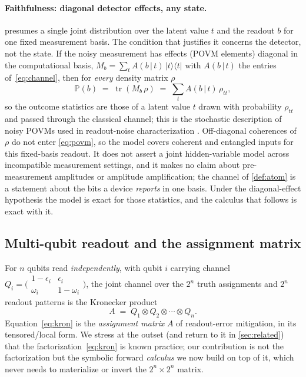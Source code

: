 \documentclass[11pt]{article}
\numberwithin{equation}{section}
\theoremstyle{plain}
\theoremstyle{definition}
\theoremstyle{remark}
\newcommand{\eps}{\epsilon}
\newcommand{\Prob}{\mathbb{P}}
\newcommand{\given}{\,\vert\,}
\newcommand{\ket}[1]{\lvert #1 \rangle}
\newcommand{\bra}[1]{\langle #1 \rvert}
\DeclareMathOperator{\tr}{tr}
\newcommand{\tensor}{\otimes}
\begin{document}
\paragraph{Faithfulness: diagonal detector effects, any state.}
 presumes a single joint distribution over the latent value $t$
and the readout $b$ for one fixed measurement basis. The condition that
justifies it concerns the detector, not the state. If the noisy measurement
has effects (POVM elements) diagonal in the computational basis,
$M_b=\sum_{t}A(b\given t)\,\ket{t}\!\bra{t}$ with $A(b\given t)$ the entries
of~\eqref{eq:channel}, then for \emph{every} density matrix $\rho$
\begin{equation}
\label{eq:povm}
  \Prob(b) \;=\; \tr(M_b\,\rho) \;=\; \sum_{t} A(b\given t)\,\rho_{tt},
\end{equation}
so the outcome statistics are those of a latent value $t$ drawn with
probability $\rho_{tt}$ and passed through the classical channel; this is the
stochastic description of noisy POVMs used in readout-noise characterization
\citep{tuziemski2023crosstalk}. Off-diagonal coherences of $\rho$ do not enter
\eqref{eq:povm}, so the model covers coherent and entangled inputs for this
fixed-basis readout. It does not assert a joint hidden-variable model across
incompatible measurement settings, and it makes no claim about pre-measurement
amplitudes or amplitude amplification; the channel of \cref{def:atom} is a
statement about the bits a device \emph{reports} in one basis. Under the
diagonal-effect hypothesis the model is exact for those statistics, and the
calculus that follows is exact with it.

\subsection{Multi-qubit readout and the assignment matrix}

For $n$ qubits read \emph{independently}, with qubit $i$ carrying channel
$Q_i=\bigl(\begin{smallmatrix}1-\eps_i & \eps_i\\ \omega_i & 1-\omega_i\end{smallmatrix}\bigr)$,
the joint channel over the $2^n$ truth assignments and $2^n$ readout patterns is
the Kronecker product
\begin{equation}
\label{eq:kron}
  A \;=\; Q_1 \tensor Q_2 \tensor \cdots \tensor Q_n .
\end{equation}
Equation~\eqref{eq:kron} is the \emph{assignment matrix} $A$ of readout-error
mitigation, in its tensored/local form. We stress at the outset (and return to
it in \cref{sec:related}) that the factorization~\eqref{eq:kron} is known
practice; our contribution is not the factorization but the symbolic forward
\emph{calculus} we now build on top of it, which never needs to materialize or
invert the $2^n\times2^n$ matrix.
\end{document}
